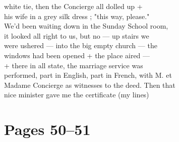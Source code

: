 \documentclass[11pt,a4paper]{article}
\begin{document}
{white tie, then the Concierge all dolled up + \\
his wife in a grey silk dress ; "this way, please." \\
We'd been waiting down in the Sunday School room, \\
it looked all right to us, but no --- up stairs we \\
were ushered --- into the big empty church --- the \\
windows had been opened + the place aired --- \\
+ there in all state, the marriage service was \\
performed, part in English, part in French, with M. et \\
Madame Concierge as witnesses to the deed. Then that \\
nice minister gave me the certificate (my lines)}



\section{Pages 50--51}
\end{document}
